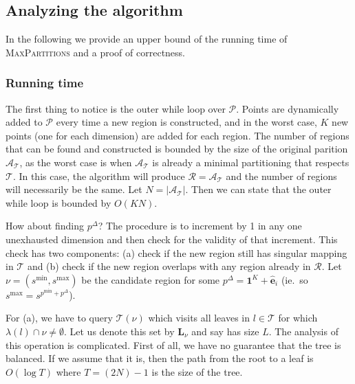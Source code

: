 \subsection{Analyzing the algorithm}%
\label{sub:maxPartsAnalysis}

In the following we provide an upper bound of the running time of
\textsc{MaxPartitions} and a proof of correctness.

\subsubsection{Running time}%
\label{sec:runningTime}

The first thing to notice is the outer while loop over $\mathcal{P}$. Points are
dynamically added to $\mathcal{P}$ every time a new region is constructed, and
in the worst case, $K$ new points (one for each dimension) are added for each
region. The number of regions that can be found and constructed is bounded by
the size of the original parition $\mathcal{A}_{\mathcal{T}}$, as the worst case
is when $\mathcal{A}_{\mathcal{T}}$ is already a minimal partitioning that
respects $\mathcal{T}$. In this case, the algorithm will produce $\mathcal{R} =
\mathcal{A}_{\mathcal{T}}$ and the number of regions will necessarily be the
same. Let $N = |\mathcal{A}_{\mathcal{T}}|$. Then we can state that the outer
while loop is bounded by $O(KN)$.


How about finding $p^{\Delta}$? The procedure is to increment by 1 in any one
unexhausted dimension and then check for the validity of that increment. This
check has two components: (a) check if the new region still has singular mapping
in $\mathcal{T}$ and (b) check if the new region overlaps with any region
already in $\mathcal{R}$. Let $\nu = (s^{\min}, s^{\max})$ be the candidate
region for some $p^{\Delta} = \mathbf{1}^{K} + \mathbf{\hat{e}}_{i}$ (ie.\ so
$s^{\max} = s^{p^{\min} + p^{\Delta}}$).

For (a), we have to query $\mathcal{T}(\nu)$ which visits all leaves in $l \in
\mathcal{T}$ for which $\lambda(l) \cap \nu \neq \emptyset$. Let us denote this
set by $\mathbf{L}_{\nu}$ and say has size $L$. The analysis of this operation
is complicated. First of all, we have no guarantee that the tree is balanced.
If we assume that it is, then the path from the root to a leaf is $O(\log T)$
where $T = (2N) - 1$ is the size of the tree.


